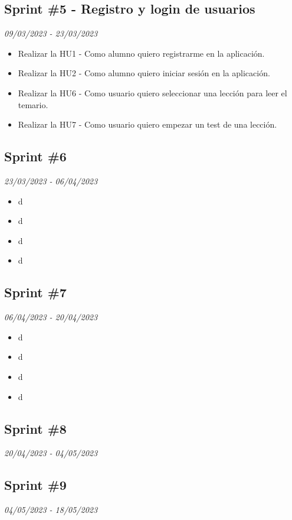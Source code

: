 \subsection{Sprint \#5 - Registro y login de usuarios}
\textit{09/03/2023   -   23/03/2023}
\begin{itemize}
    \item Realizar la HU1 - Como alumno quiero registrarme en la aplicación.
    \item Realizar la HU2 - Como alumno quiero iniciar sesión en la aplicación.
    \item Realizar la HU6 - Como usuario quiero seleccionar una lección para leer el temario.
    \item Realizar la HU7 - Como usuario quiero empezar un test de una lección. 
\end{itemize}


\subsection{Sprint \#6}
\textit{23/03/2023   -   06/04/2023}
\begin{itemize}
    \item d
    \item d
    \item d
    \item d

\end{itemize}

\subsection{Sprint \#7}
\textit{06/04/2023   -   20/04/2023}
\begin{itemize}
    \item d
    \item d
    \item d
    \item d

\end{itemize}

\subsection{Sprint \#8}
\textit{20/04/2023   -   04/05/2023}


\subsection{Sprint \#9}
\textit{04/05/2023   -   18/05/2023}


